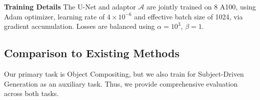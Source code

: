 

\noindent
\textbf{Training Details} The U-Net and adaptor $\mathcal{A}$ are jointly trained on 8 A100, using Adam optimizer, learning rate of $4 \times 10^{-6}$ and effective batch size of 1024, via gradient accumulation. Losses are balanced using $\alpha = 10^{3}$, $\beta = 1$.


\subsection{Comparison to Existing Methods}

Our primary task is Object Compositing, but we also train for Subject-Driven Generation as an auxiliary task. Thus, we provide comprehensive evaluation across both tasks. %


